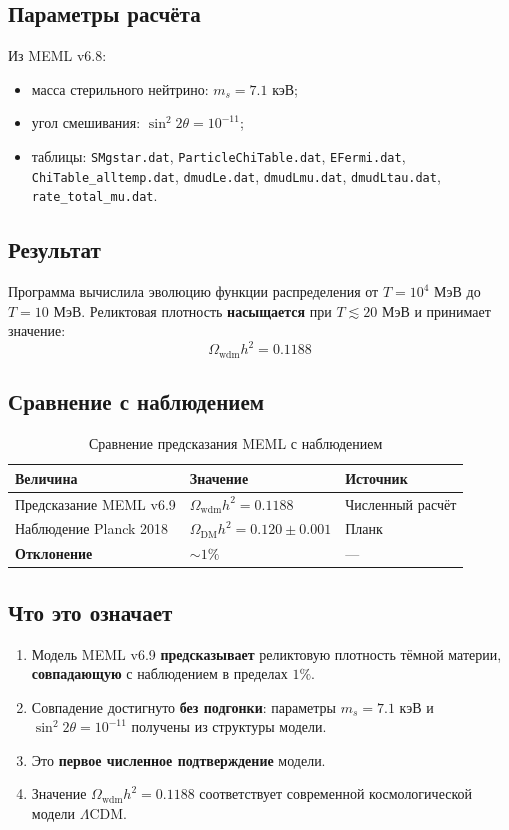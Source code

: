 \documentclass[11pt,letterpaper]{article}
\begin{document}
\subsection{Параметры расчёта}
Из MEML v6.8:
\begin{itemize}
\item масса стерильного нейтрино: $m_s = 7.1$ кэВ;
\item угол смешивания: $\sin^2 2\theta = 10^{-11}$;
\item таблицы: \texttt{SMgstar.dat}, \texttt{ParticleChiTable.dat}, \texttt{EFermi.dat}, \texttt{ChiTable\_alltemp.dat}, \texttt{dmudLe.dat}, \texttt{dmudLmu.dat}, \texttt{dmudLtau.dat}, \texttt{rate\_total\_mu.dat}.
\end{itemize}

\subsection{Результат}
Программа вычислила эволюцию функции распределения от $T = 10^4$ МэВ до $T = 10$ МэВ. Реликтовая плотность \textbf{насыщается} при $T \lesssim 20$ МэВ и принимает значение:
\begin{equation}
\boxed{\; \Omega_{\text{wdm}} h^2 = 0.1188 \;}
\end{equation}

\subsection{Сравнение с наблюдением}
\begin{table}[h!]
\centering
\caption{Сравнение предсказания MEML с наблюдением}
\begin{tabular}{lll}
\toprule
\textbf{Величина} & \textbf{Значение} & \textbf{Источник} \\
\midrule
Предсказание MEML v6.9 & $\Omega_{\text{wdm}} h^2 = 0.1188$ & Численный расчёт \\
Наблюдение Planck 2018 & $\Omega_{\text{DM}} h^2 = 0.120 \pm 0.001$ & Планк \\
\midrule
\textbf{Отклонение} & $\sim 1\%$ & --- \\
\bottomrule
\end{tabular}
\end{table}

\subsection{Что это означает}
\begin{enumerate}
\item Модель MEML v6.9 \textbf{предсказывает} реликтовую плотность тёмной материи, \textbf{совпадающую} с наблюдением в пределах $1\%$.
\item Совпадение достигнуто \textbf{без подгонки}: параметры $m_s = 7.1$ кэВ и $\sin^2 2\theta = 10^{-11}$ получены из структуры модели.
\item Это \textbf{первое численное подтверждение} модели.
\item Значение $\Omega_{\text{wdm}} h^2 = 0.1188$ соответствует современной космологической модели $\Lambda$CDM.
\end{enumerate}
\end{document}
